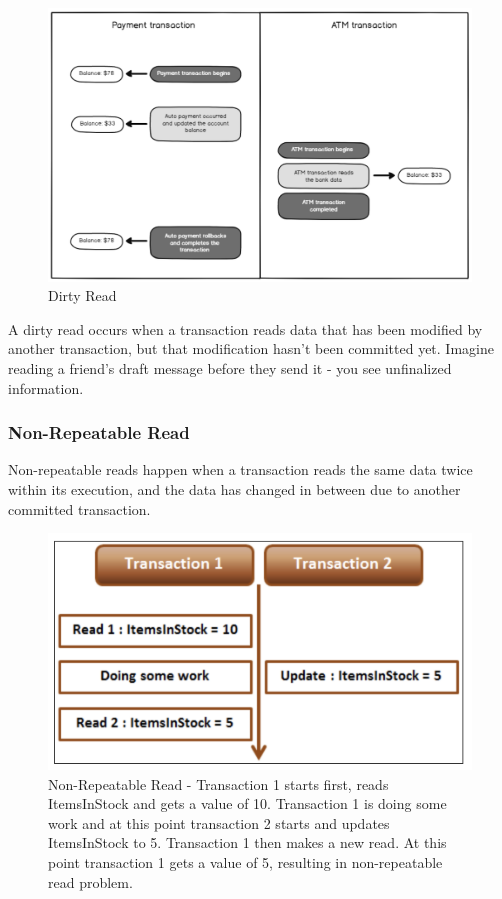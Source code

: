 \begin{figure}[H]
  \includegraphics[width=\linewidth]{images/jdbc/dirty_read.png}
  \caption{Dirty Read}
  \label{fig:paths}
\end{figure}

A dirty read occurs when a transaction reads data that has been modified by another transaction, but that modification hasn't been committed yet. Imagine reading a friend's draft message before they send it - you see unfinalized information.

\subsubsection{Non-Repeatable Read}

Non-repeatable reads happen when a transaction reads the same data twice within its execution, and the data has changed in between due to another committed transaction. 

\begin{figure}[H]
  \includegraphics[width=\linewidth]{images/jdbc/non_repeatable_read.png}
  \caption{Non-Repeatable Read - Transaction 1 starts first,  reads ItemsInStock and gets a value of 10. Transaction 1 is doing some work and at this point transaction 2 starts and updates ItemsInStock to 5. Transaction 1 then makes a new read. At this point transaction 1 gets a value of 5,  resulting in non-repeatable read problem. }
  \label{fig:paths}
\end{figure}


